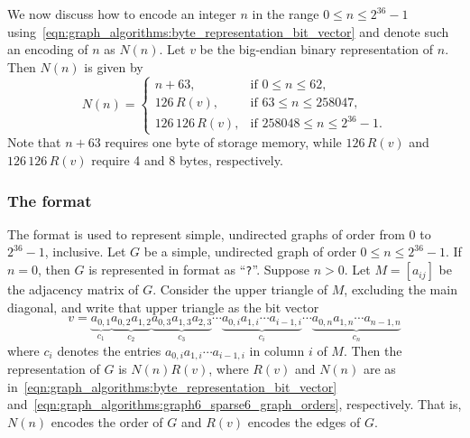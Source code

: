 We now discuss how to encode an integer $n$ in the range
$0 \leq n \leq 2^{36} - 1$
using~\eqref{eqn:graph_algorithms:byte_representation_bit_vector} and
denote such an encoding of $n$ as $N(n)$. Let $v$ be the
big-endian binary representation of $n$. Then $N(n)$
is given by
\begin{equation}
\label{eqn:graph_algorithms:graph6_sparse6_graph_orders}
N(n)
=
\begin{cases}
n + 63, & \text{if $0 \leq n \leq 62$}, \\[4pt]
126 \, R(v), & \text{if $63 \leq n \leq 258047$}, \\[4pt]
126 \, 126 \, R(v), & \text{if $258048 \leq n \leq 2^{36}-1$}.
\end{cases}
\end{equation}
Note that $n + 63$ requires one byte of storage memory, while
$126 \, R(v)$ and $126 \, 126 \, R(v)$ require 4 and 8 bytes,
respectively.



\subsubsection{The \graphsix format}
\index{\graphsix}

The \graphsix\index{\graphsix} format is used to represent simple,
undirected graphs of order from $0$ to $2^{36} - 1$, inclusive. Let
$G$ be a simple, undirected graph of order $0 \leq n \leq 2^{36} - 1$.
If $n = 0$, then $G$ is represented in \graphsix format as
``\verb!?!''. Suppose $n > 0$. Let $M = [a_{ij}]$ be the adjacency
matrix of $G$. Consider the upper
triangle of $M$, excluding the main
diagonal, and write that upper triangle as
the bit vector
\[
v
=
\underbrace{a_{0,1}}_{c_1}
\underbrace{a_{0,2} a_{1,2}}_{c_2}
\underbrace{a_{0,3} a_{1,3} a_{2,3}}_{c_3} \cdots
\underbrace{a_{0,i} a_{1,i} \cdots a_{i-1,i}}_{c_i} \cdots
\underbrace{a_{0,n} a_{1,n} \cdots a_{n-1,n}}_{c_n}
\]
where $c_i$ denotes the entries $a_{0,i} a_{1,i} \cdots a_{i-1,i}$ in
column $i$ of $M$. Then the \graphsix\index{\graphsix} representation
of $G$ is $N(n) R(v)$, where $R(v)$ and $N(n)$ are as
in~\eqref{eqn:graph_algorithms:byte_representation_bit_vector}
and~\eqref{eqn:graph_algorithms:graph6_sparse6_graph_orders},
respectively. That is, $N(n)$ encodes the order of $G$ and $R(v)$
encodes the edges of $G$.


